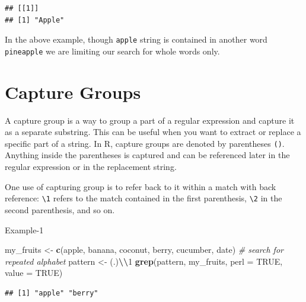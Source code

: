 \documentclass[
]{book}
\newenvironment{Shaded}{\begin{snugshade}}{\end{snugshade}}
\newcommand{\AttributeTok}[1]{\textcolor[rgb]{0.13,0.29,0.53}{#1}}
\newcommand{\CommentTok}[1]{\textcolor[rgb]{0.56,0.35,0.01}{\textit{#1}}}
\newcommand{\ConstantTok}[1]{\textcolor[rgb]{0.56,0.35,0.01}{#1}}
\newcommand{\FunctionTok}[1]{\textcolor[rgb]{0.13,0.29,0.53}{\textbf{#1}}}
\newcommand{\NormalTok}[1]{#1}
\newcommand{\OtherTok}[1]{\textcolor[rgb]{0.56,0.35,0.01}{#1}}
\newcommand{\SpecialCharTok}[1]{\textcolor[rgb]{0.81,0.36,0.00}{\textbf{#1}}}
\newcommand{\StringTok}[1]{\textcolor[rgb]{0.31,0.60,0.02}{#1}}
\begin{document}
\begin{verbatim}
## [[1]]
## [1] "Apple"
\end{verbatim}

In the above example, though \texttt{apple} string is contained in another word \texttt{pineapple} we are limiting our search for whole words only.

\hypertarget{capture-groups}{%
\section{Capture Groups}\label{capture-groups}}

A capture group is a way to group a part of a regular expression and capture it as a separate substring. This can be useful when you want to extract or replace a specific part of a string. In R, capture groups are denoted by parentheses \texttt{()}. Anything inside the parentheses is captured and can be referenced later in the regular expression or in the replacement string.

One use of capturing group is to refer back to it within a match with back reference: \texttt{\textbackslash{}1} refers to the match contained in the first parenthesis, \texttt{\textbackslash{}2} in the second parenthesis, and so on.

Example-1

\begin{Shaded}
\begin{Highlighting}[]
\NormalTok{my\_fruits }\OtherTok{\textless{}{-}} \FunctionTok{c}\NormalTok{(}\StringTok{\textquotesingle{}apple\textquotesingle{}}\NormalTok{, }\StringTok{\textquotesingle{}banana\textquotesingle{}}\NormalTok{, }\StringTok{\textquotesingle{}coconut\textquotesingle{}}\NormalTok{, }\StringTok{\textquotesingle{}berry\textquotesingle{}}\NormalTok{, }\StringTok{\textquotesingle{}cucumber\textquotesingle{}}\NormalTok{, }\StringTok{\textquotesingle{}date\textquotesingle{}}\NormalTok{)}
\CommentTok{\# search for repeated alphabet}
\NormalTok{pattern }\OtherTok{\textless{}{-}} \StringTok{\textquotesingle{}(.)}\SpecialCharTok{\textbackslash{}\textbackslash{}}\StringTok{1\textquotesingle{}}
\FunctionTok{grep}\NormalTok{(pattern, my\_fruits, }\AttributeTok{perl =} \ConstantTok{TRUE}\NormalTok{, }\AttributeTok{value =} \ConstantTok{TRUE}\NormalTok{)}
\end{Highlighting}
\end{Shaded}

\begin{verbatim}
## [1] "apple" "berry"
\end{verbatim}
\end{document}
